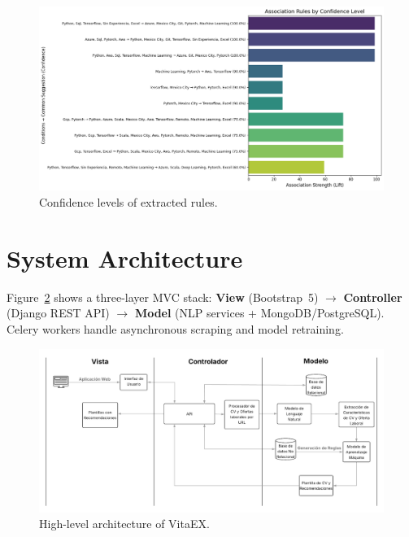 \documentclass[12pt,a4paper]{article}
\begin{document}
	 \begin{figure}[H]
		     \centering
		     \includegraphics[width=0.9\linewidth]{imagenes/confidence_distribution.png}
		     \caption{Confidence levels of extracted rules.}
		     \label{fig:confidence_distribution}
		 \end{figure}
	
	
	\section{System Architecture}
	Figure~\ref{fig:blocks} shows a three-layer MVC stack: \textbf{View} (Bootstrap~5) $\rightarrow$ \textbf{Controller} (Django REST API) $\rightarrow$ \textbf{Model} (NLP services + MongoDB/PostgreSQL). Celery workers handle asynchronous scraping and model retraining.
	
	\begin{figure}[H]
		\centering
		\includegraphics[width=1\linewidth]{imagenes/Arquitectura_Sistema.png}
		\caption{High-level architecture of VitaEX.}
		\label{fig:blocks}
	\end{figure}
	\newpage
\end{document}
